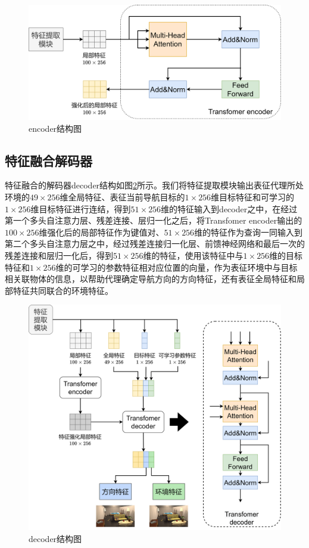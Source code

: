 \begin{figure}[htbp]
    \centering
    \includegraphics[scale=0.10]{Fig/encoder.png}
    \caption{\label{encoder}encoder结构图}
\end{figure}


\subsection{特征融合解码器}
特征融合的解码器decoder结构如图\ref{decoder}所示。我们将特征提取模块输出表征代理所处环境的$49 \times 256$维全局特征、表征当前导航目标的$1 \times 256$维目标特征和可学习的$1 \times 256$维目标特征进行连结，得到$51 \times 256$维的特征输入到decoder之中，在经过第一个多头自注意力层、残差连接、层归一化之后，将Transfomer encoder输出的$100 \times 256$维强化后的局部特征作为键值对、$51 \times 256$维的特征作为查询一同输入到第二个多头自注意力层之中，经过残差连接归一化层、前馈神经网络和最后一次的残差连接和层归一化后，得到$51 \times 256$维的特征，使用该特征中与$1 \times 256$维的目标特征和$1 \times 256$维的可学习的参数特征相对应位置的向量，作为表征环境中与目标相关联物体的信息，以帮助代理确定导航方向的方向特征，还有表征全局特征和局部特征共同联合的环境特征。
\begin{figure}[htbp]
    \centering
    \includegraphics[scale=0.08]{Fig/decoder.png}
    \caption{\label{decoder}decoder结构图}
\end{figure}


